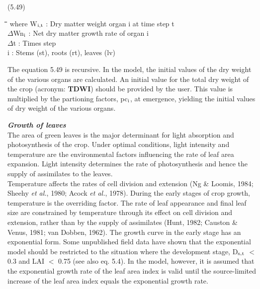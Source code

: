 \documentclass[11pt]{article}
\begin{document}
 \bigskip
\strut\hfill (5.49)
\nwln
\begin{tabbing}
\hspace{1.27cm}\=\hspace{1.27cm}\=\hspace{1.27cm}\=\hspace{1.27cm}\=%
\hspace{1.27cm}\=\hspace{1.27cm}\=\hspace{1.27cm}\=\hspace{1.27cm}\=%
\hspace{1.27cm}\=\hspace{1.27cm}\=\kill
where\> W$_{{\rm i,t}}$\> : Dry matter weight organ i at time step t\> \> \> \> \> \> \> \> [kg ha$^{{\rm -1}}$]\\
\>$\Delta$Wn$_{{\rm i}}$\> : Net dry matter growth rate of organ i\> \> \> \> \> \> \> \> [kg ha$^{{\rm -1}}$ d$^{{\rm -1}}$]\\
\>$\Delta$t\> : Times step\> \> \> \> \> \> \> \> [d]\\
\>i\> : Stems (st), roots (rt), leaves (lv)
\end{tabbing}

 The equation 5.49 is recursive. In the model, the initial values of the dry weight of the
various organs are calculated. An initial value for the total dry weight of the crop
(acronym: {\bf TDWI}) should be provided by the user. This value is multiplied by the
partioning factors, pc$_{{\rm i}}$, at emergence, yielding the initial values of dry weight of the
various organs.

\bigskip
\bigskip
{\it {\bf Growth of leaves}\/}\\
The area of green leaves is the major determinant for light absorption and photosyn\-thesis
of the crop. Under optimal conditions, light intensity and temperature are the environ\-mental factors influencing the rate of leaf area expansion. Light intensity determines the
rate of photosynthesis and hence the supply of assimilates to the leaves. \\
Temperature affects the rates of cell division and extension (Ng \& Loomis, 1984; Sheehy
{\it et al.\/}, 1980; Acock {\it et al.\/}, 1978). During the early stages of crop growth, temperature is
the overriding factor. The rate of leaf appearance and final leaf size are constrained by
temperature through its effect on cell division and extension, rather than by the supply of
assimilates (Hunt, 1982; Causton \& Venus, 1981; van Dobben, 1962). The growth curve
in the early stage has an exponential form. Some unpublished field data have shown that
the exponential model should be restricted to the situation where the develop\-ment stage, 
D$_{{\rm s,t}}$ $<$ 0.3 and LAI $<$ 0.75 (see also eq. 5.4). In the model, however, it is assumed that
the exponen\-tial growth rate of the leaf area index is valid until the source-limited increase
of the leaf area index equals the exponential growth rate.
\end{document}
